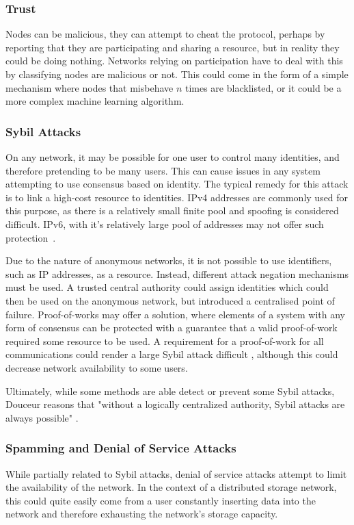 		\subsubsection*{Trust}
			Nodes can be malicious, they can attempt to cheat the protocol, perhaps by reporting that they are participating and sharing a resource, but in reality they could be doing nothing. Networks relying on participation have to deal with this by classifying nodes are malicious or not. This could come in the form of a simple mechanism where nodes that misbehave $n$ times are blacklisted, or it could be a more complex machine learning algorithm.
		\subsubsection*{Sybil Attacks} \label{sybil_problems}
			On any network, it may be possible for one user to control many identities, and therefore pretending to be many users. This can cause issues in any system attempting to use consensus based on identity. The typical remedy for this attack is to link a high-cost resource to identities. IPv4 addresses are commonly used for this purpose, as there is a relatively small finite pool and spoofing is considered difficult. IPv6, with it's relatively large pool of addresses may not offer such protection~\cite{cholez2009evaluation}.
			
			Due to the nature of anonymous networks, it is not possible to use identifiers, such as IP addresses, as a resource. Instead, different attack negation mechanisms must be used. A trusted central authority could assign identities which could then be used on the anonymous network, but introduced a centralised point of failure. Proof-of-works may offer a solution, where elements of a system with any form of consensus can be protected with a guarantee that a valid proof-of-work required some resource to be used. A requirement for a proof-of-work for all communications could render a large Sybil attack difficult \cite{borisov2006computational}, although this could decrease network availability to some users.
		
			Ultimately, while some methods are able detect or prevent some Sybil attacks, Douceur reasons that "without a logically centralized
			authority, Sybil attacks are always possible" \cite{douceur2002sybil}.
		\subsubsection*{Spamming and Denial of Service Attacks}
			While partially related to Sybil attacks, denial of service attacks attempt to limit the availability of the network. In the context of a distributed storage network, this could quite easily come from a user constantly inserting data into the network and therefore exhausting the network's storage capacity.
			
